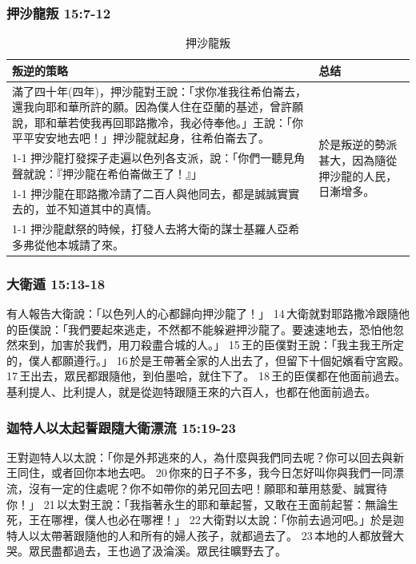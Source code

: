 \subsubsection{押沙龍叛 15:7-12}
\begin{table}[H]
\hspace*{-8mm}
\centering 
\begin{tabular}{p{15.5cm}|p{2.25cm}}\hline\hline
叛逆的策略&总结\\\hline
滿了四十年(四年)，押沙龍對王說：「求你准我往希伯崙去，還我向耶和華所許的願。因為僕人住在亞蘭的基述，曾許願說，耶和華若使我再回耶路撒冷，我必侍奉他。」王說：「你平平安安地去吧！」押沙龍就起身，往希伯崙去了。&\multirow{4}{2.35cm}{於是叛逆的勢派甚大，因為隨從押沙龍的人民，日漸增多。
}\\\cline{1-1}
押沙龍打發探子走遍以色列各支派，說：「你們一聽見角聲就說：『押沙龍在希伯崙做王了！』」&\\\cline{1-1}
押沙龍在耶路撒冷請了二百人與他同去，都是誠誠實實去的，並不知道其中的真情。&\\\cline{1-1}
押沙龍獻祭的時候，打發人去將大衛的謀士基羅人亞希多弗從他本城請了來。&\\\hline
\end{tabular}
\caption{押沙龍叛}
\end{table}


\subsubsection{大衛遁 15:13-18}
有人報告大衛說：「以色列人的心都歸向押沙龍了！」 14 大衛就對耶路撒冷跟隨他的臣僕說：「我們要起來逃走，不然都不能躲避押沙龍了。要速速地去，恐怕他忽然來到，加害於我們，用刀殺盡合城的人。」 15 王的臣僕對王說：「我主我王所定的，僕人都願遵行。」 16 於是王帶著全家的人出去了，但留下十個妃嬪看守宮殿。 17 王出去，眾民都跟隨他，到伯墨哈，就住下了。 18 王的臣僕都在他面前過去。基利提人、比利提人，就是從迦特跟隨王來的六百人，也都在他面前過去。

\subsubsection{迦特人以太起誓跟隨大衛漂流 15:19-23}
王對迦特人以太說：「你是外邦逃來的人，為什麼與我們同去呢？你可以回去與新王同住，或者回你本地去吧。 20 你來的日子不多，我今日怎好叫你與我們一同漂流，沒有一定的住處呢？你不如帶你的弟兄回去吧！願耶和華用慈愛、誠實待你！」 21 以太對王說：「我指著永生的耶和華起誓，又敢在王面前起誓：無論生死，王在哪裡，僕人也必在哪裡！」 22 大衛對以太說：「你前去過河吧。」於是迦特人以太帶著跟隨他的人和所有的婦人孩子，就都過去了。 23 本地的人都放聲大哭。眾民盡都過去，王也過了汲淪溪。眾民往曠野去了。

